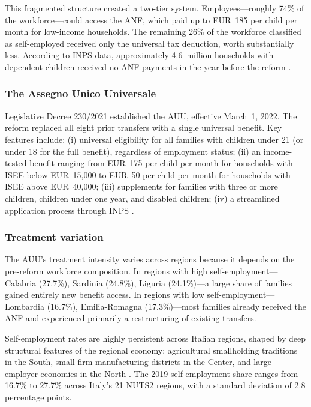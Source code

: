 \documentclass[12pt]{article}
\begin{document}
This fragmented structure created a two-tier system. Employees---roughly 74\% of the workforce---could access the ANF, which paid up to EUR~185 per child per month for low-income households. The remaining 26\% of the workforce classified as self-employed received only the universal tax deduction, worth substantially less. According to INPS data, approximately 4.6~million households with dependent children received no ANF payments in the year before the reform \citep{inps2022auu}.

\subsubsection*{The Assegno Unico Universale} Legislative Decree 230/2021 established the AUU, effective March~1, 2022. The reform replaced all eight prior transfers with a single universal benefit. Key features include: (i) universal eligibility for all families with children under 21 (or under 18 for the full benefit), regardless of employment status; (ii) an income-tested benefit ranging from EUR~175 per child per month for households with ISEE below EUR~15,000 to EUR~50 per child per month for households with ISEE above EUR~40,000; (iii) supplements for families with three or more children, children under one year, and disabled children; (iv) a streamlined application process through INPS \citep{inps2022auu}.

\subsubsection*{Treatment variation} The AUU's treatment intensity varies across regions because it depends on the pre-reform workforce composition. In regions with high self-employment---Calabria (27.7\%), Sardinia (24.8\%), Liguria (24.1\%)---a large share of families gained entirely new benefit access. In regions with low self-employment---Lombardia (16.7\%), Emilia-Romagna (17.3\%)---most families already received the ANF and experienced primarily a restructuring of existing transfers.

Self-employment rates are highly persistent across Italian regions, shaped by deep structural features of the regional economy: agricultural smallholding traditions in the South, small-firm manufacturing districts in the Center, and large-employer economies in the North \citep{ferrante2018self, catalan2022self}. The 2019 self-employment share ranges from 16.7\% to 27.7\% across Italy's 21 NUTS2 regions, with a standard deviation of 2.8 percentage points.
\end{document}
